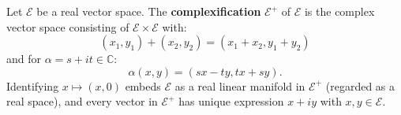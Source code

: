 Let $\mathcal{E}$ be a real vector space. The \textbf{complexification} $\mathcal{E}^+$ of $\mathcal{E}$ is the complex vector space consisting of $\mathcal{E} \times \mathcal{E}$ with:
$$(x_1, y_1) + (x_2, y_2) = (x_1 + x_2, y_1 + y_2)$$
and for $\alpha = s + it \in \mathbb{C}$:
$$\alpha(x, y) = (sx - ty, tx + sy).$$
Identifying $x \mapsto (x, 0)$ embeds $\mathcal{E}$ as a real linear manifold in $\mathcal{E}^+$ (regarded as a real space), and every vector in $\mathcal{E}^+$ has unique expression $x + iy$ with $x, y \in \mathcal{E}$.

